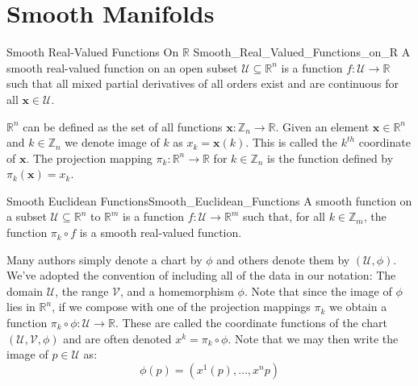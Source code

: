 \documentclass[oneside]{book}                                                  %
\begin{document}
        \section{Smooth Manifolds}
            \begin{fdefinition}{Smooth Real-Valued Functions On $\mathbb{R}$}
                               {Smooth_Real_Valued_Functions_on_R}
                A smooth real-valued function on an open subset
                $\mathcal{U}\subseteq\mathbb{R}^{n}$ is a function
                $f:\mathcal{U}\rightarrow\mathbb{R}$ such that all mixed partial
                derivatives of all orders exist and are continuous for all
                $\mathbf{x}\in\mathcal{U}$.
            \end{fdefinition}
            $\mathbb{R}^{n}$ can be defined as the set of all functions
            $\mathbf{x}:\mathbb{Z}_{n}\rightarrow\mathbb{R}$. Given an element
            $\mathbf{x}\in\mathbb{R}^{n}$ and $k\in\mathbb{Z}_{n}$ we denote image
            of $k$ as $x_{k}=\mathbf{x}(k)$. This is called the $k^{th}$ coordinate
            of $\mathbf{x}$. The projection mapping
            $\pi_{k}:\mathbb{R}^{n}\rightarrow\mathbb{R}$ for $k\in\mathbb{Z}_{n}$ is
            the function defined by $\pi_{k}(\mathbf{x})=x_{k}$.
            \begin{ldefinition}{Smooth Euclidean Functions}{Smooth_Euclidean_Functions}
                A smooth function on a subset $\mathcal{U}\subseteq\mathbb{R}^{n}$
                to $\mathbb{R}^{m}$ is a function
                $f:\mathcal{U}\rightarrow\mathbb{R}^{m}$ such that, for all
                $k\in\mathbb{Z}_{m}$, the function $\pi_{k}\circ{f}$ is a smooth
                real-valued function.
            \end{ldefinition}
            Many authors simply denote a chart by $\phi$ and others denote them
            by $(\mathcal{U},\phi)$. We've adopted the convention of including all of
            the data in our notation: The domain $\mathcal{U}$, the range $\mathcal{V}$,
            and a homemorphism $\phi$. Note that since the image of $\phi$ lies in
            $\mathbb{R}^{n}$, if we compose with one of the projection mappings
            $\pi_{k}$ we obtain a function
            $\pi_{k}\circ\phi:\mathcal{U}\rightarrow\mathbb{R}$. These are called the
            coordinate functions of the chart $(\mathcal{U},\mathcal{V},\phi)$ and are
            often denoted $x^{k}=\pi_{k}\circ\phi$. Note that we may then write the
            image of $p\in\mathcal{U}$ as:
            \begin{equation}
                \phi(p)=(x^{1}(p),\dots,x^{n}{p})
            \end{equation}
\end{document}

